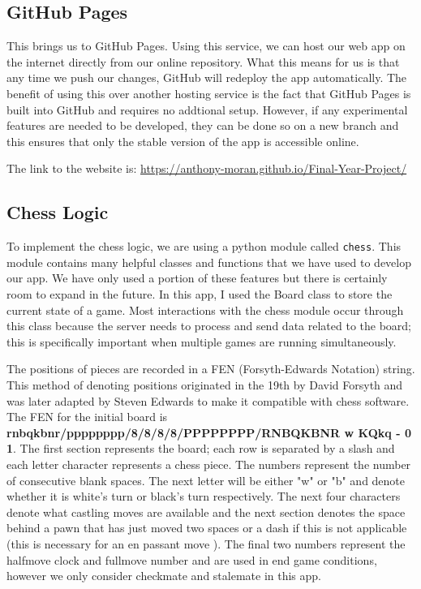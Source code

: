 \subsection{GitHub Pages}

This brings us to GitHub Pages. Using this service, we can host our web app on the internet directly from our online repository. What this means for us is that any time we push our changes, GitHub will redeploy the app automatically. The benefit of using this over another hosting service is the fact that GitHub Pages is built into GitHub and requires no addtional setup. However, if any experimental features are needed to be developed, they can be done so on a new branch and this ensures that only the stable version of the app is accessible online.

The link to the website is: \url{https://anthony-moran.github.io/Final-Year-Project/}

\subsection{Chess Logic}

To implement the chess logic, we are using a python module called \lstinline{chess}. This module contains many helpful classes and functions that we have used to develop our app. We have only used a portion of these features but there is certainly room to expand in the future. In this app, I used the Board class to store the current state of a game. Most interactions with the chess module occur through this class because the server needs to process and send data related to the board; this is specifically important when multiple games are running simultaneously.

The positions of pieces are recorded in a FEN (Forsyth-Edwards Notation) \cite{PGNStandard} string. This method of denoting positions originated in the 19th by David Forsyth and was later adapted by Steven Edwards to make it compatible with chess software. The FEN for the initial board is \textbf{rnbqkbnr/pppppppp/8/8/8/8/PPPPPPPP/RNBQKBNR w KQkq - 0 1}. The first section represents the board; each row is separated by a slash and each letter character represents a chess piece. The numbers represent the number of consecutive blank spaces. The next letter will be either "w" or "b" and denote whether it is white's turn or black's turn respectively. The next four characters denote what castling moves are available and the next section denotes the space behind a pawn that has just moved two spaces or a dash if this is not applicable (this is necessary for an en passant move \cite{EnPassant}). The final two numbers represent the halfmove clock and fullmove number and are used in end game conditions, however we only consider checkmate and stalemate in this app.


